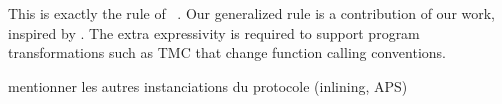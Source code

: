 This is exactly the  rule of \Simuliris~\citep*{TODO-simuliris}.
Our generalized rule  is a contribution of our work, inspired by \citet*{TODO-paulo}.
The extra expressivity is required to support program transformations such as TMC that change function calling conventions.







mentionner les autres instanciations du protocole (inlining, APS)



